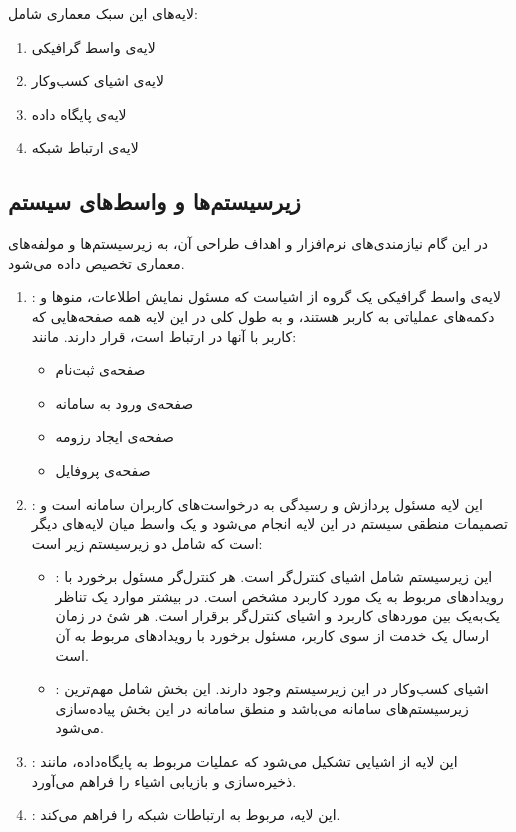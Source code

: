 لایه‌های این سبک معماری شامل:
\begin{enumerate}
	\item 
	لایه‌ی واسط گرافیکی
	\item
	لایه‌ی اشیای کسب‌وکار
	\item 
	لایه‌ی پایگاه داده
	\item 
	لایه‌ی ارتباط شبکه
\end{enumerate}

\subsection{زیرسیستم‌‌ها و واسط‌های سیستم}
در این گام نیازمندی‌های نرم‌افزار و اهداف طراحی آن، به زیرسیستم‌ها و مولفه‌های معماری تخصیص داده می‌شود.
\begin{enumerate}
	\item {}:
	لایه‌ی واسط گرافیکی یک گروه‌ از اشیاست که مسئول نمایش اطلاعات، منو‌ها و دکمه‌های عملیاتی به کاربر هستند، و به طول کلی در این لایه همه صفحه‌هایی که کاربر با آنها در ارتباط است، قرار دارند. مانند:
	\begin{itemize}
		\item 
		صفحه‌ی ثبت‌نام
		\item 
		صفحه‌ی ورود به سامانه
		\item 
		صفحه‌ی ایجاد رزومه
		\item 
		صفحه‌ی پروفایل
	\end{itemize}
	
	\item {}:
	این لایه مسئول پردازش و رسیدگی به درخواست‌های کاربران سامانه‌ است و تصمیمات منطقی سیستم در این لایه انجام می‌شود و یک واسط میان لایه‌های دیگر است که شامل دو زیرسیستم زیر است:
	\begin{itemize}
		\item {}:
		این زیرسیستم شامل اشیای کنترل‌گر است. هر کنترل‌گر مسئول برخورد با رویداد‌های مربوط به یک مورد کاربرد مشخص است. در بیشتر موارد یک تناظر یک‌به‌یک بین مورد‌های کاربرد و اشیای کنترل‌گر برقرار است. هر شئ در زمان ارسال یک خدمت از سوی کاربر، مسئول برخورد با رویداد‌های مربوط به آن است.
		
		\item {}:
		اشیای کسب‌وکار در این زیرسیستم وجود دارند. این بخش شامل مهم‌ترین زیرسیستم‌های سامانه می‌باشد و منطق سامانه در این بخش پیاده‌سازی می‌شود.
		
	\end{itemize}
	
	\item {}:
	این لایه‌ از اشیایی تشکیل می‌شود که عملیات مربوط به پایگاه‌داده، مانند ذخیره‌سازی و بازیابی اشیاء را فراهم می‌آورد.
	
	\item {}:
	این لایه‌، مربوط به ارتباطات شبکه را فراهم می‌کند.
	
\end{enumerate}
